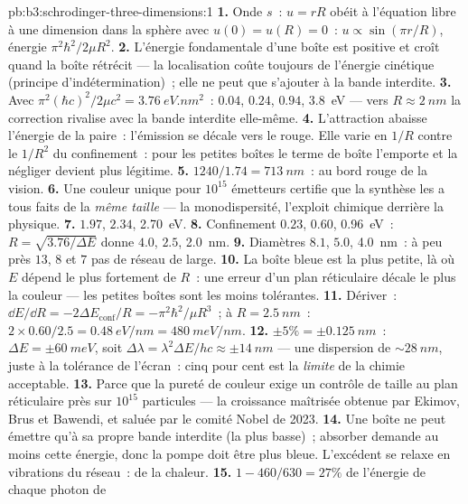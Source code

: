 \begin{solution}{pb:b3:schrodinger-three-dimensions:1}
\textbf{1.} Onde $s$~: $u = rR$ obéit à l'équation libre à une
dimension dans la sphère avec $u(0) = u(R) = 0$~: $u \propto \sin(\pi r/R)$,
énergie $\pi^2\hbar^2/2\mu R^2$.
\textbf{2.} L'énergie fondamentale d'une boîte est positive et croît
quand la boîte rétrécit --- la localisation coûte toujours de l'énergie
cinétique (principe d'indétermination)~; elle ne peut que s'ajouter à
la bande interdite.
\textbf{3.} Avec $\pi^2(\hbar c)^2/2\mu c^2 = \qty{3.76}{eV.nm^2}$~:
$0.04$, $0.24$, $0.94$, \qty{3.8}{eV} --- vers $R \approx \qty{2}{nm}$
la correction rivalise avec la bande interdite elle-même.
\textbf{4.} L'attraction abaisse l'énergie de la paire~: l'émission se
décale vers le rouge. Elle varie en $1/R$ contre le $1/R^2$ du
confinement~: pour les petites boîtes le terme de boîte l'emporte et la
négliger devient plus légitime.
\textbf{5.} $1240/1.74 = \qty{713}{nm}$~: au bord rouge de la vision.
\textbf{6.} Une couleur unique pour $10^{15}$ émetteurs certifie que la
synthèse les a tous faits de la \emph{même taille} --- la
monodispersité, l'exploit chimique derrière la physique.
\textbf{7.} $1.97$, $2.34$, \qty{2.70}{eV}.
\textbf{8.} Confinement $0.23$, $0.60$, \qty{0.96}{eV}~: $R =
\sqrt{3.76/\Delta E}$ donne $4.0$, $2.5$, \qty{2.0}{nm}.
\textbf{9.} Diamètres $8.1$, $5.0$, \qty{4.0}{nm}~: à peu près $13$,
$8$ et $7$ pas de réseau de large.
\textbf{10.} La boîte bleue est la plus petite, là où $E$ dépend le
plus fortement de $R$~: une erreur d'un plan réticulaire décale le plus
la couleur --- les petites boîtes sont les moins tolérantes.
\textbf{11.} Dériver~: $\dd E/\dd R = -2\Delta E_{\text{conf}}/R
= -\pi^2\hbar^2/\mu R^3$~; à $R = \qty{2.5}{nm}$~: $2 \times 0.60/2.5
= \qty{0.48}{eV/nm} = \qty{480}{meV/nm}$.
\textbf{12.} $\pm 5\% = \pm\qty{0.125}{nm}$~: $\Delta E = \pm
\qty{60}{meV}$, soit $\Delta\lambda = \lambda^2\Delta E/hc \approx
\pm\qty{14}{nm}$ --- une dispersion de $\sim\qty{28}{nm}$, juste à la
tolérance de l'écran~: cinq pour cent est la \emph{limite} de la chimie
acceptable.
\textbf{13.} Parce que la pureté de couleur exige un contrôle de taille
au plan réticulaire près sur $10^{15}$ particules --- la croissance
maîtrisée obtenue par Ekimov, Brus et Bawendi, et saluée par le comité
Nobel de 2023.
\textbf{14.} Une boîte ne peut émettre qu'à sa propre bande interdite
(la plus basse)~; absorber demande au moins cette énergie, donc la
pompe doit être plus bleue. L'excédent se relaxe en vibrations du
réseau~: de la chaleur.
\textbf{15.} $1 - 460/630 = 27\%$ de l'énergie de chaque photon de

\end{solution}
